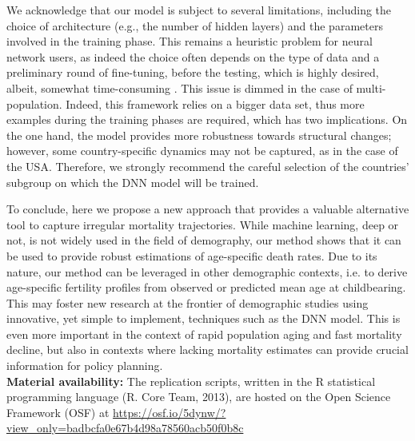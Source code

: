 \documentclass[a4,11pt]{article}
\begin{document}
We acknowledge that our model is subject to several limitations, including the choice of architecture (e.g., the number of hidden layers) and the parameters involved in the training phase. This remains a heuristic problem for neural network users, as indeed the choice often depends on the type of data and a preliminary round of fine-tuning, before the testing, which is highly desired, albeit, somewhat time-consuming \citep{Nigri}. This issue is dimmed in the case of multi-population. Indeed, this framework relies on a bigger data set, thus more examples during the training phases are required, which has two implications. On the one hand, the model provides more robustness towards structural changes; however, some country-specific dynamics may not be captured, as in the case of the USA. Therefore, we strongly recommend the careful selection of the countries' subgroup on which the DNN model will be trained.

To conclude, here we propose a new approach that provides a valuable alternative tool to capture irregular mortality trajectories. While machine learning, deep or not, is not widely used in the field of demography, our method shows that it can be used to provide robust estimations of age-specific death rates. 
Due to its nature, our method can be leveraged in other demographic contexts, i.e. to derive age-specific fertility profiles from observed or predicted mean age at childbearing. This may foster new research at the frontier of demographic studies using innovative, yet simple to implement, techniques such as the DNN model. This is even more important in the context of rapid population aging and fast mortality decline, but also in contexts where lacking mortality estimates can provide crucial information for policy planning.
\\

\noindent
\textbf{Material availability:} 
The replication scripts, written in the R statistical programming language (R. Core Team, 2013), are hosted on the Open Science Framework (OSF) at \url{https://osf.io/5dynw/?view_only=badbcfa0e67b4d98a78560acb50f0b8c}\\
\end{document}
